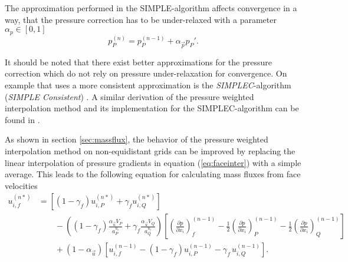 The approximation performed in the SIMPLE-algorithm affects convergence in a way, that the pressure correction has to be under-relaxed with a parameter \(\alpha_p \in [0,1]\)
\begin{equation}
  \label{eq:pressupdate}
  p_P^{(n)} = p_P^{(n-1)} + \alpha_{\vec{p}} p_P'.
\end{equation}

It should be noted that there exist better approximations for the pressure correction which do not rely on pressure under-relaxation for convergence. On example that uses a more consistent approximation is the \emph{SIMPLEC}-algorithm (\emph{SIMPLE Consistent}) \cite{doormaal84}. A similar derivation of the pressure weighted interpolation method and its implementation for the SIMPLEC-algorithm can be found in \cite{miller88}.

As shown in section \ref{sec:massflux}, the behavior of the pressure weighted interpolation method on non-equidistant grids can be improved by replacing the linear interpolation of pressure gradients in equation (\ref{eq:faceinter}) with a simple average. This leads to the following equation for calculating mass fluxes from face velocities
\begin{align}
  \label{eq:facecorr2}
  u_{i,f}^{(n*)} 
  &=
  \left[\left(1 - \gamma_f\right) u_{i,P}^{(n*)} + \gamma_f u_{i,Q}^{(n*)} \right] \nonumber\\[1em]
  &\quad\quad - 
  \left(\left(1 - \gamma_f\right) \frac{\alpha_\vec{u} V_P}{a_P^{u_i}} + \gamma_f \frac{\alpha_\vec{u} V_Q}{a_Q^{u_i}}\right)
  \left[ 
  \left(\frac{\partial p}{\partial x_i}\right)_f^{(n-1)} 
  -  \frac{1}{2} \left( \frac{\partial p}{\partial x_i} \right)_P^{(n-1)} 
  -  \frac{1}{2} \left(\frac{\partial p}{\partial x_i}\right)_Q^{(n-1)} 
  \right] \nonumber \\[1em]
  &\quad\quad + \left(1 - \alpha_\vec{u}\right) \left[ u_{i,f}^{(n-1)} - \left(1 - \gamma_f\right) u_{i,P}^{(n-1)} - \gamma_f \, u_{i,Q}^{(n-1)} \right].
\end{align}

